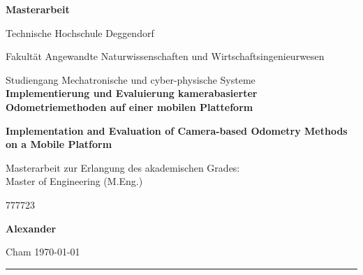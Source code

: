 \begin{titlepage}
  
    \centering

      \Large
      \vspace{5cm}
      
      \textbf{Masterarbeit}
    
		\linespread{2}   
		   
      	\normalsize Technische Hochschule Deggendorf\\ 
      	\linespread{2}
      	
      	\normalsize Fakultät Angewandte Naturwissenschaften und Wirtschaftsingenieurwesen\\
      	\linespread{2}
      	
      	\normalsize Studiengang Mechatronische und cyber-physische Systeme\\
      	
	      
	  	\Large
	  	\vspace{0.5cm}
	  \textbf{Implementierung und Evaluierung kamerabasierter Odometriemethoden auf einer mobilen Platteform}
	  \vspace{0.5cm}
	  
	  \textbf{Implementation and Evaluation of Camera-based Odometry Methods on a Mobile Platform}
	  \vspace{1cm}
  
      \normalsize Masterarbeit zur Erlangung des akademischen Grades:\\
      \normalsize Master of Engineering (M.Eng.)
      
      \vspace{1.0cm}
        {777723}{}

      \textbf{Alexander}

      \vspace{\fill}
      
      \normalsize Cham \today
      
      \rule{\textwidth}{.5pt}
      
\end{titlepage}